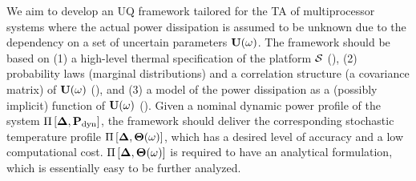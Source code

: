 We aim to develop an UQ framework tailored for the TA of multiprocessor systems where the actual power dissipation is assumed to be unknown due to the dependency on a set of uncertain parameters $\mathbf{U}(\omega)$. The framework should be based on (1) a high-level thermal specification of the platform $\mathcal{S}$ (), (2) probability laws (marginal distributions) and a correlation structure (a covariance matrix) of $\mathbf{U}(\omega)$ (), and (3) a model of the power dissipation as a (possibly implicit) function of $\mathbf{U}(\omega)$ (). Given a nominal dynamic power profile of the system $\prof{\mP_\dyn}$, the framework should deliver the corresponding stochastic temperature profile $\Pi\left[\boldsymbol{\Delta}, {\boldsymbol\Theta}(\omega)\right]$, which has a desired level of accuracy and a low computational cost. $\Pi\left[\boldsymbol{\Delta}, {\boldsymbol\Theta}(\omega)\right]$ is required to have an analytical formulation, which is essentially easy to be further analyzed.
